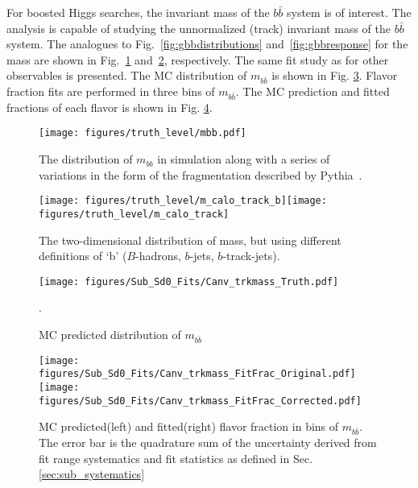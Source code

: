 
For boosted Higgs searches, the invariant mass of the $b\bar b$ system is of interest. The analysis is capable of studying the unnormalized (track) invariant mass of the $b\bar b $ system. The analogues to Fig.~\ref{fig:gbbdistributions} and~\ref{fig:gbbresponse} for the mass are shown in Fig.~\ref{fig:gbbdistributionsm} and~\ref{fig:gbbresponsemass}, respectively. The same fit study as for other observables is presented. The MC distribution of $m_{b\bar b}$ is shown in Fig. \ref{fig:trkmass}. Flavor fraction fits are performed in three bins of $m_{b\bar b} $. The MC prediction and fitted fractions of each flavor is shown in Fig. \ref{fig:trkmass-fitfrac}. 

\begin{figure}[htpb!]
\begin{center}
\texttt{[image: figures/truth\_level/mbb.pdf]}
\caption[]{The distribution of $m_{bb}$ in simulation along with a series of variations in the form of the fragmentation described by Pythia~\cite{pythiavariations}.} 
\label{fig:gbbdistributionsm}
\end{center}
\end{figure}

\begin{figure}[htpb!]
\begin{center}
\texttt{[image: figures/truth\_level/m\_calo\_track\_b]}\texttt{[image: figures/truth\_level/m\_calo\_track]}
\caption[]{The two-dimensional distribution of mass, but using different definitions of `b' ($B$-hadrons, $b$-jets, $b$-track-jets).} 
\label{fig:gbbresponsemass}
\end{center}
\end{figure}


\begin{figure}[htbp]
  \centering
 \texttt{[image: figures/Sub\_Sd0\_Fits/Canv\_trkmass\_Truth.pdf]}
\caption{ MC predicted distribution of $m_{b\bar b}$ }.
  \label{fig:trkmass}
\end{figure}


\begin{figure}[htbp]
  \centering
 \texttt{[image: figures/Sub\_Sd0\_Fits/Canv\_trkmass\_FitFrac\_Original.pdf]}
 \texttt{[image: figures/Sub\_Sd0\_Fits/Canv\_trkmass\_FitFrac\_Corrected.pdf]}

\caption{MC predicted(left) and fitted(right) flavor fraction in bins of $m_{b\bar b}$. The error bar is the quadrature sum of the uncertainty derived from fit range systematics and fit statistics as defined in Sec.\ref{sec:sub_systematics}}
  \label{fig:trkmass-fitfrac}
\end{figure}

